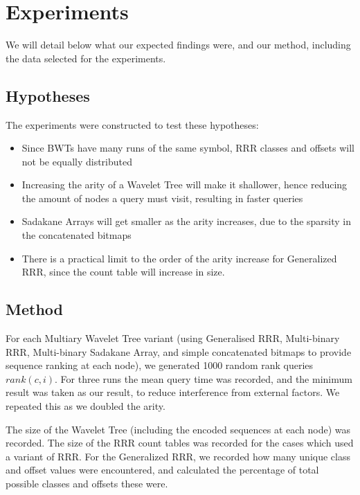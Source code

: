 \section{Experiments}
We will detail below what our expected findings were, and our method, including 
the data selected for the experiments.

\subsection{Hypotheses}
The experiments were constructed to test these hypotheses:

\begin{itemize}
    \item 	
			Since BWTs have many runs of the same symbol, RRR classes and 
			offsets will not be equally distributed

    \item 	
			Increasing the arity of a Wavelet Tree will make it shallower,
		   	hence reducing the amount of nodes a query must visit, resulting
		   	in faster queries
		
    \item 	
			Sadakane Arrays will get smaller as the arity increases, due to
			the sparsity in the concatenated bitmaps
			
    \item  
			There is a practical limit to the order of the arity increase for 
		   	Generalized RRR, since the count table will increase in size.
\end{itemize}

\subsection{Method}
For each Multiary Wavelet Tree variant (using Generalised RRR, Multi-binary
RRR, Multi-binary Sadakane Array, and simple concatenated bitmaps to provide
sequence ranking at each node), we generated 1000 random rank queries $rank(c, 
i)$. For three runs the mean query time was recorded, and the minimum result was
taken as our result, to reduce interference from external factors. We repeated
this as we doubled the arity.

The size of  the Wavelet Tree (including the encoded sequences at each node) was 
recorded. The size of the RRR count tables was recorded for the cases which used 
a variant of RRR. For the Generalized RRR, we recorded how many unique class and 
offset values were encountered, and calculated the percentage of total possible 
classes and offsets these were.


